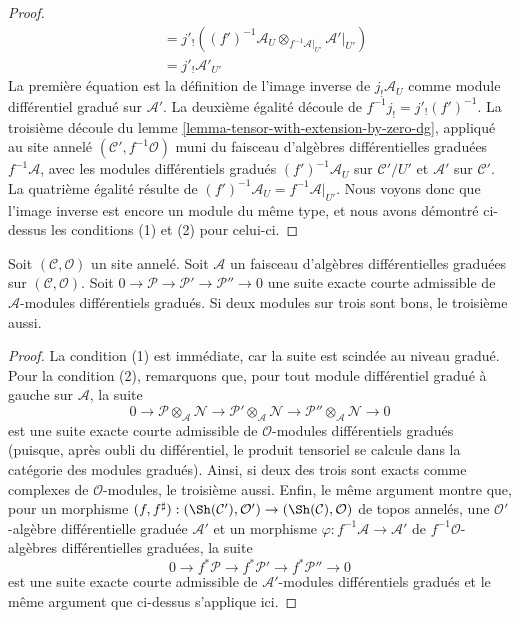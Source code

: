\begin{proof}
\begin{align*}
&
= j'_!\left(
(f')^{-1}\mathcal{A}_U \otimes_{f^{-1}\mathcal{A}|_{U'}}
\mathcal{A}'|_{U'}\right) \\
&
= j'_!\mathcal{A}'_{U'}
\end{align*}
La première équation est la définition de l'image inverse de $j_!\mathcal{A}_U$
comme module différentiel gradué sur $\mathcal{A}'$.
La deuxième égalité découle de $f^{-1}j_! = j'_!(f')^{-1}$.
La troisième découle du lemme \ref{lemma-tensor-with-extension-by-zero-dg},
appliqué au site annelé $(\mathcal{C}', f^{-1}\mathcal{O})$ muni
du faisceau d'algèbres différentielles graduées $f^{-1}\mathcal{A}$,
avec les modules différentiels gradués $(f')^{-1}\mathcal{A}_U$ sur $\mathcal{C}'/U'$
et $\mathcal{A}'$ sur $\mathcal{C}'$.
La quatrième égalité résulte de
$(f')^{-1}\mathcal{A}_U = f^{-1}\mathcal{A}|_{U'}$. Nous voyons donc que
l'image inverse est encore un module du même type, et nous
avons démontré ci-dessus les conditions (1) et (2) pour celui-ci.
\end{proof}

\begin{lemma}
\label{lemma-good-admissible-ses}
Soit $(\mathcal{C}, \mathcal{O})$ un site annelé.
Soit $\mathcal{A}$ un faisceau d'algèbres différentielles
graduées sur $(\mathcal{C}, \mathcal{O})$.
Soit $0 \to \mathcal{P} \to \mathcal{P}' \to \mathcal{P}'' \to 0$
une suite exacte courte admissible de
$\mathcal{A}$-modules différentiels gradués. Si deux modules sur trois sont
bons, le troisième aussi.
\end{lemma}

\begin{proof}
La condition (1) est immédiate, car la suite est scindée au niveau gradué.
Pour la condition (2), remarquons que, pour tout module
différentiel gradué à gauche sur $\mathcal{A}$, la suite
$$ 0
\to
\mathcal{P} \otimes_\mathcal{A} \mathcal{N} \to
\mathcal{P}' \otimes_\mathcal{A} \mathcal{N} \to
\mathcal{P}'' \otimes_\mathcal{A} \mathcal{N} \to 0
$$ est une
suite exacte courte admissible de
$\mathcal{O}$-modules différentiels gradués (puisque, après oubli du différentiel, le
produit tensoriel se calcule dans la catégorie des modules gradués). Ainsi,
si deux des trois sont exacts comme complexes de $\mathcal{O}$-modules, le
troisième aussi. Enfin, le même argument montre que, pour un
morphisme $(f, f^\sharp) : (\Sh(\mathcal{C}'), \mathcal{O}')
\to (\Sh(\mathcal{C}), \mathcal{O})$ de topos
annelés, une $\mathcal{O}'$-algèbre différentielle graduée
$\mathcal{A}'$ et un morphisme $\varphi : f^{-1}\mathcal{A} \to \mathcal{A}'$ de
$f^{-1}\mathcal{O}$-algèbres différentielles graduées,
la suite
$$ 0
\to f^*\mathcal{P} \to f^*\mathcal{P}' \to f^*\mathcal{P}'' \to 0
$$ est
une suite exacte courte admissible de
$\mathcal{A}'$-modules différentiels gradués et le même argument que ci-dessus s'applique ici.
\end{proof}

